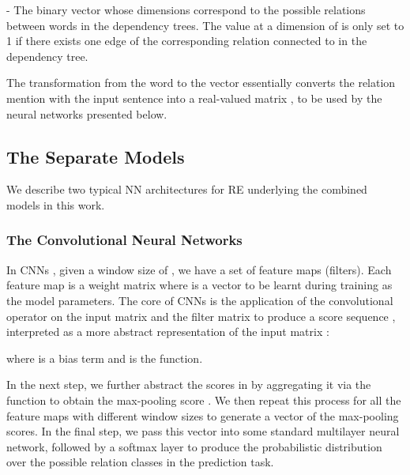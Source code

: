 \documentclass[11pt,letterpaper]{article}
\begin{document}
- The binary vector  whose dimensions correspond to the possible relations between words in the dependency trees. The value at a dimension of  is only set to 1 if there exists one edge of the corresponding relation connected to  in the dependency tree.





The transformation from the word  to the vector  essentially converts the relation mention with the input sentence  into a real-valued matrix , to be used by the neural networks presented below.



\subsection{The Separate Models}

\label{sec:separateModel}

We describe two typical NN architectures for RE underlying the combined models in this work.

\subsubsection{The Convolutional Neural Networks}

\label{sec:cnn}

In CNNs \cite{Kalchbrenner:14,Kim:14}, given a window size of , we have a set of  feature maps (filters). Each feature map  is a weight matrix  where  is a vector to be learnt during training as the model parameters. The core of CNNs is the application of the convolutional operator on the input matrix  and the filter matrix  to produce a score sequence , interpreted as a more abstract representation of the input matrix :


where  is a bias term and  is the  function.





In the next step, we further abstract the scores in  by aggregating it via the  function to obtain the max-pooling score . We then repeat this process for all the  feature maps with different window sizes  to generate a vector of the max-pooling scores. In the final step, we pass this vector into some standard multilayer neural network, followed by a softmax layer to produce the probabilistic distribution  over the possible relation classes  in the prediction task.
\end{document}

